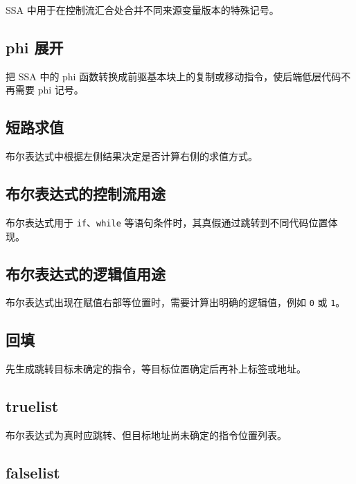 \documentclass[UTF8,zihao=-4]{ctexart}
\begin{document}
SSA 中用于在控制流汇合处合并不同来源变量版本的特殊记号。

\subsection*{phi 展开}

把 SSA 中的 phi 函数转换成前驱基本块上的复制或移动指令，使后端低层代码不再需要 phi 记号。

\subsection*{短路求值}

布尔表达式中根据左侧结果决定是否计算右侧的求值方式。

\subsection*{布尔表达式的控制流用途}

布尔表达式用于 \texttt{if}、\texttt{while} 等语句条件时，其真假通过跳转到不同代码位置体现。

\subsection*{布尔表达式的逻辑值用途}

布尔表达式出现在赋值右部等位置时，需要计算出明确的逻辑值，例如 \texttt{0} 或 \texttt{1}。

\subsection*{回填}

先生成跳转目标未确定的指令，等目标位置确定后再补上标签或地址。

\subsection*{truelist}

布尔表达式为真时应跳转、但目标地址尚未确定的指令位置列表。

\subsection*{falselist}
\end{document}
